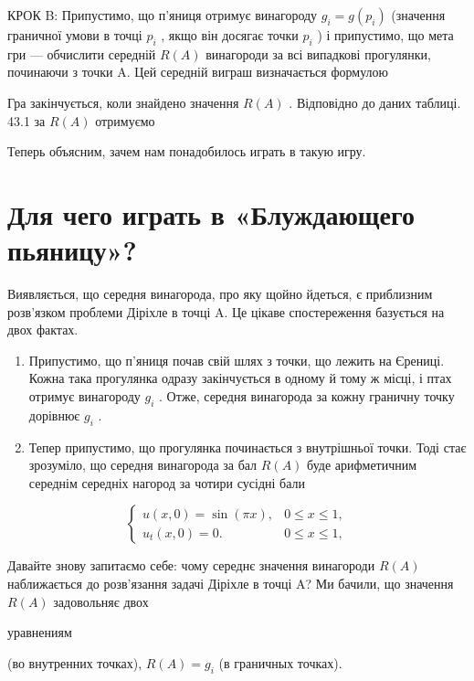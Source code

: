 \documentclass[
  ukrainian,
]{article}
\begin{document}
КРОК B: Припустимо, що п'яниця отримує винагороду
\(g_i = g\left(p_i\right)\) (значення граничної умови в точці \(p_i\) ,
якщо він досягає точки \(p_i\) ) і припустимо, що мета гри --- обчислити
середній \(R\left(A\right)\) винагороди за всі випадкові прогулянки,
починаючи з точки A. Цей середній виграш визначається формулою

Гра закінчується, коли знайдено значення \(R\left(A\right)\) .
Відповідно до даних таблиці. 43.1 за \(R\left(A\right)\) отримуємо

Теперь объясним, зачем нам понадобилось играть в такую игру.

\section{Для чего играть в «Блуждающего
пьяницу»?}\label{ux434ux43bux44f-ux447ux435ux433ux43e-ux438ux433ux440ux430ux442ux44c-ux432-ux431ux43bux443ux436ux434ux430ux44eux449ux435ux433ux43e-ux43fux44cux44fux43dux438ux446ux443}

Виявляється, що середня винагорода, про яку щойно йдеться, є приблизним
розв'язком проблеми Діріхле в точці A. Це цікаве спостереження базується
на двох фактах.

\begin{enumerate}
\def\labelenumi{\arabic{enumi}.}
\item
  Припустимо, що п'яниця почав свій шлях з точки, що лежить на Єрениці.
  Кожна така прогулянка одразу закінчується в одному й тому ж місці, і
  птах отримує винагороду \(g_i\) . Отже, середня винагорода за кожну
  граничну точку дорівнює \(g_i\) .
\item
  Тепер припустимо, що прогулянка починається з внутрішньої точки. Тоді
  стає зрозуміло, що середня винагорода за бал \(R(A)\) буде
  арифметичним середнім середніх нагород за чотири сусідні бали
\end{enumerate}

\[
\begin{cases} u(x, 0) = \sin(\pi x), & 0 \le x \le 1, \\ u_t(x, 0) = 0. & 0 \le x \le 1, \end{cases}
\]

Давайте знову запитаємо себе: чому середнє значення винагороди \(R(A)\)
наближається до розв'язання задачі Діріхле в точці A? Ми бачили, що
значення \(R(A)\) задовольняє двох

уравнениям

(во внутренних точках), \(R(A) = g_i\) (в граничных точках).
\end{document}
